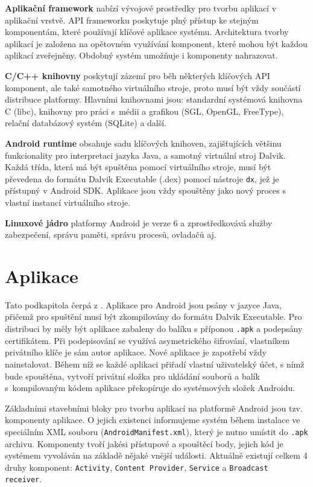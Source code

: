\bigskip \textbf{Aplikační framework} nabízí vývojové prostředky pro tvorbu aplikací
v aplikační vrstvě. API frameworku poskytuje plný přístup ke stejným komponentám, které používají klíčové aplikace systému. Architektura tvorby aplikací je založena na opětovném využívání komponent, které mohou být každou aplikací zveřejněny. Obdobný systém umožňuje i komponenty nahrazovat.

\bigskip \textbf{C/C++ knihovny} poskytují zázemí pro běh některých klíčových
API komponent, ale také samotného virtuálního stroje, proto musí být vždy
součástí distribuce platformy. Hlavními knihovnami jsou: standardní systémová knihovna C (libc), knihovny pro práci s~médii a grafikou (SGL, OpenGL, FreeType), relační databázový systém (SQLite) a další.

\bigskip \textbf{Android runtime} obsahuje sadu klíčových knihoven,
zajišťujících většinu funkcionality pro interpretaci jazyka Java, a samotný
virtuální stroj Dalvik. Každá třída, která má být spuštěna pomocí virtuálního
stroje, musí být převedena do formátu Dalvik Executable (.dex) pomocí nástroje
\texttt{dx}, jež je přístupný v Android SDK. Aplikace jsou vždy
spouštěny jako nový proces s vlastní instancí virtuálního stroje.

\bigskip \textbf{Linuxové jádro} platformy Android je verze 6 a zprostředkovává
služby zabezpečení, správu paměti, správu procesů, ovladačů aj.

\section{Aplikace}

Tato podkapitola čerpá z \cite{applicationAndroidFundamentals}. Aplikace pro
Android jsou psány v jazyce Java, přičemž pro spuštění musí být zkompilovány do formátu Dalvik Executable. Pro distribuci by měly být aplikace
zabaleny do balíku s příponou \texttt{.apk} a podepsány certifikátem. Při
podepisování se využívá asymetrického šifrování, vlastníkem privátního klíče je sám autor
aplikace. Nové aplikace je zapotřebí vždy nainstalovat. Během níž se každé
aplikaci přiřadí vlastní uživatelský účet, s nímž bude spouštěna, vytvoří
privátní složka pro ukládání souborů a balík s~kompilovaným kódem aplikace
překopíruje do systémových složek Androidu.

Základními stavebními bloky pro tvorbu aplikací na platformě Android jsou tzv.
komponenty aplikace. O jejich existenci informujeme systém během instalace ve
speciálním XML souboru (\texttt{AndroidManifest.xml}), který je nutno umístit do
\texttt{.apk} archivu. Komponenty tvoří jakési přístupové a spouštěcí body,
jejich kód je systémem vyvoláván na základě nějaké vnější události. Aktuálně
existují celkem 4 druhy komponent: \texttt{Activity}, \texttt{Content Provider},
\texttt{Service} a \texttt{Broadcast receiver}.

